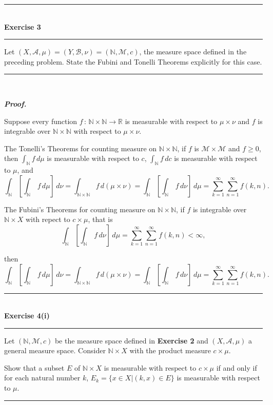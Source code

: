 \documentclass[a4paper,11pt]{article}
\begin{document}
\begin{flushleft}
	\rule[-0.5ex]{17cm}{2pt}\\
		\textbf{Exercise 3}\\
	\rule[1.5ex]{17cm}{0.5pt}
		Let $(X,\mathcal{A},\mu) = (Y,\mathcal{B},\nu) = (\mathbb{N},\mathcal{M},c)$, the measure space defined in the preceding problem. State the Fubini and Tonelli Theorems explicitly for this case.
	\rule[1.0ex]{17cm}{0.5pt}\
\end{flushleft}

\textbf{\textit{Proof.}}



Suppose every function $f\,:\,\mathbb{N} \times \mathbb{N} \to \mathbb{R}$ is measurable with respect to $\mu \times \nu$ and $f$ is integrable over $\mathbb{N} \times \mathbb{N}$ with respect to $\mu \times \nu$.

The Tonelli's Theorems for counting measure on $\mathbb{N} \times \mathbb{N}$, if $f$ is $\mathcal{M} \times \mathcal{M}$ and $f \geq 0$, then $\int_\mathbb{N}f\,d\mu$ is measurable with respect to $c$, $\int_\mathbb{N}f\,dc$ is measurable with respect to $\mu$, and
	$$\int_{\mathbb{N}} \left[ \int_{\mathbb{N}}\,f\,d\mu \right]\,d\nu
	= \int_{\mathbb{N} \times \mathbb{N}} f\,d(\mu \times \nu)
	= \int_{\mathbb{N}} \left[ \int_{\mathbb{N}}\,f\,d\nu \right]\,d\mu
	= \sum_{k=1}^\infty \sum_{n=1}^\infty f(k,n).$$

The Fubini's Theorems for counting measure on $\mathbb{N} \times \mathbb{N}$, if $f$ is integrable over $\mathbb{N} \times X$ with repect to $c \times \mu$, that is
	$$\int_{\mathbb{N}} \left[ \int_{\mathbb{N}}\,f\,d\nu \right]\,d\mu
	= \sum_{k=1}^\infty \sum_{n=1}^\infty f(k,n)
	< \infty,$$

then
	$$\int_{\mathbb{N}} \left[ \int_{\mathbb{N}}\,f\,d\mu \right]\,d\nu
	= \int_{\mathbb{N} \times \mathbb{N}} f\,d(\mu \times \nu)
	= \int_{\mathbb{N}} \left[ \int_{\mathbb{N}}\,f\,d\nu \right]\,d\mu
	= \sum_{k=1}^\infty \sum_{n=1}^\infty f(k,n).$$


\begin{flushleft}
	\rule[-0.5ex]{17cm}{2pt}\\
		\textbf{Exercise 4(i)}\\
	\rule[1.5ex]{17cm}{0.5pt}
		Let $(\mathbb{N},\mathcal{M},c)$ be the measure space defined in \textbf{Exercise 2} and $(X, \mathcal{A}, \mu)$ a general measure space. Consider $\mathbb{N} \times X$ with the product measure $c \times \mu$.

		Show that a subset $E$ of $\mathbb{N} \times X$ is measurable with respect to $c \times \mu$ if and only if for each natural number $k$, $E_k = \{x \in X | (k,x) \in E\}$ is measurable with respect to $\mu$.
	\rule[1.0ex]{17cm}{0.5pt}\
\end{flushleft}
\end{document}
